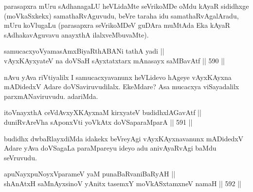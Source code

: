 \begin{artha}
parasapxra mUru sAdhanagaLU heVLidaMte seVrikoMDe oMdu kAyaR sididhxge
(moVkaSxkekx) samathaRvAguvudu, beVre taraha idu samathaRvAgalAradu,
mUru koVlugaLu (parasapxra seVrikoMDeV guDAra muMtAda Eka kAyaR
sAdhakavAguvavu anayxthA ilalxveMbuvaMte).
\end{artha}


\begin{shl}
\footnotemark[1]samucacxyoV\s yamasAmxBiyaRthA\s BANi tathA yadi ||  \\
vAyxKAyxyateV na doVSaH sAyxtatxtarx mAnasayx saMBavAtf \hfill || 590 ||  
\end{shl}

\begin{artha}
nAvu yAva riVtiyalilx I samucacxyavanunx heVLidevo hAgeye vAyxKAyxna mADidedxV Adare doVSaviruvudilalx. EkeMdare? Asa mucacxya viSayadalilx parxmANaviruvudu. adariMda.
\end{artha}


\begin{shl}
itoV\s \footnotemark[2]nayxthA ceVdAvxyXKAyxnaM kirxyateV budidhxlAGavAtf || \\
duniRvAreVha sA\s \s ponxVti yoVkAtx doVSaparaMparA \hfill || 591 ||  
\end{shl}

\begin{artha}
budidhx dwbaRlayxdiMda idakekx beVreyAgi vAyxKAyxnavanunx mADidedxV Adare yAva doVSagaLa paraMpareyu ideyo adu anivAyaRvAgi baMdu seVruvudu.
\end{artha}


\begin{shl}
apuNayxpuNoyxVparameV yaM punaBaRvaniBaRyAH || \\
shAnAtxH saMnAyxsinoV yAnitx tasemxY moVkASxtamxneV namaH \hfill || 592 ||  
\end{shl}

